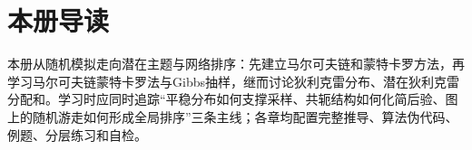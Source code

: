 \documentclass[UTF8,a4paper,11pt,openany]{ctexbook}
\begin{document}
\raggedbottom
\frontmatter
\SLMakeTitle
\chapter*{本册导读}
本册从随机模拟走向潜在主题与网络排序：先建立马尔可夫链和蒙特卡罗方法，再学习马尔可夫链蒙特卡罗法与Gibbs抽样，继而讨论狄利克雷分布、潜在狄利克雷分配和\PageRank{}。学习时应同时追踪“平稳分布如何支撑采样、共轭结构如何化简后验、图上的随机游走如何形成全局排序”三条主线；各章均配置完整推导、算法伪代码、例题、分层练习和自检。
\SLPrintSourceNotice
\SLPrintContents
\mainmatter
{}








\backmatter
\SLPrintReferences
\printbookindexes
\end{document}
